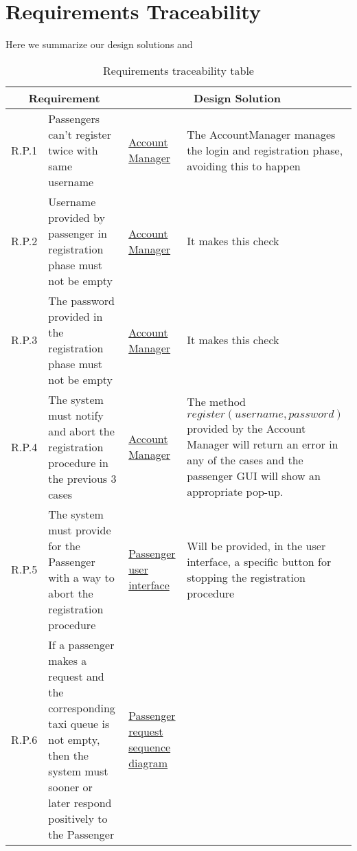\chapter{Requirements Traceability}\label{chapter:requirementsTraceability}
Here we summarize our design solutions and 
\begin{table}[H]
\centering
\begin{longtable}{|p{}|p{}|p{}|p{}|}
\hline
\multicolumn{2}{|c|}{\textbf{Requirement}} & \multicolumn{2}{c|}{\textbf{Design Solution}} \\ \hline
R.P.1 & Passengers can't register twice with same username & \hyperref[comp:accountManager]{Account Manager} & The AccountManager manages the login and registration phase, avoiding this to happen  \\ \hline
R.P.2 & Username provided by passenger in registration phase must not be empty & \hyperref[comp:accountManager]{Account Manager} & It makes this check \\ \hline
R.P.3 & The password provided in the registration phase must not be empty & \hyperref[comp:accountManager]{Account Manager} & It makes this check \\ \hline
R.P.4 & The system must notify and abort the registration procedure in the previous 3 cases & \hyperref[comp:accountManager]{Account Manager} & The method $register(username,password)$ provided by the Account Manager will return an error in any of the cases and the passenger GUI will show an appropriate pop-up. \\ \hline
R.P.5 & The system must provide for the Passenger with a way to abort the registration procedure & \hyperref[ux:passengerApp]{Passenger user interface} & Will be provided, in the user interface, a specific button for stopping the registration procedure \\ \hline
R.P.6 & If a passenger makes a request and the corresponding taxi queue is not empty, then the system must sooner or later respond positively to the Passenger & 
\hyperref[seq:passengerMakesRequest]{Passenger request sequence diagram} &  \\ \hline
\end{longtable} 
\caption{Requirements traceability table}
\label{tab:reqTraceTable}
\end{table}